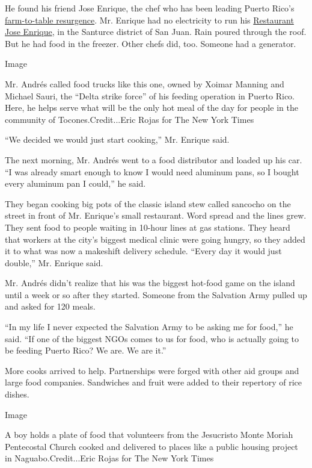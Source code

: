 He found his friend Jose Enrique, the chef who has been leading Puerto
Rico's
\href{https://www.nytimes.com/2015/02/18/dining/reclaiming-puerto-ricos-food-paradise.html}{farm-to-table
resurgence}. Mr. Enrique had no electricity to run his
\href{http://joseenriquepr.com/}{Restaurant Jose Enrique}, in the
Santurce district of San Juan. Rain poured through the roof. But he had
food in the freezer. Other chefs did, too. Someone had a generator.

Image

Mr. Andrés called food trucks like this one, owned by Xoimar Manning and
Michael Sauri, the ``Delta strike force'' of his feeding operation in
Puerto Rico. Here, he helps serve what will be the only hot meal of the
day for people in the community of Tocones.Credit...Eric Rojas for The
New York Times

``We decided we would just start cooking,'' Mr. Enrique said.

The next morning, Mr. Andrés went to a food distributor and loaded up
his car. ``I was already smart enough to know I would need aluminum
pans, so I bought every aluminum pan I could,'' he said.

They began cooking big pots of the classic island stew called sancocho
on the street in front of Mr. Enrique's small restaurant. Word spread
and the lines grew. They sent food to people waiting in 10-hour lines at
gas stations. They heard that workers at the city's biggest medical
clinic were going hungry, so they added it to what was now a makeshift
delivery schedule. ``Every day it would just double,'' Mr. Enrique said.

Mr. Andrés didn't realize that his was the biggest hot-food game on the
island until a week or so after they started. Someone from the Salvation
Army pulled up and asked for 120 meals.

``In my life I never expected the Salvation Army to be asking me for
food,'' he said. ``If one of the biggest NGOs comes to us for food, who
is actually going to be feeding Puerto Rico? We are. We are it.''

More cooks arrived to help. Partnerships were forged with other aid
groups and large food companies. Sandwiches and fruit were added to
their repertory of rice dishes.

Image

A boy holds a plate of food that volunteers from the Jesucristo Monte
Moriah Pentecostal Church cooked and delivered to places like a public
housing project in Naguabo.Credit...Eric Rojas for The New York Times

